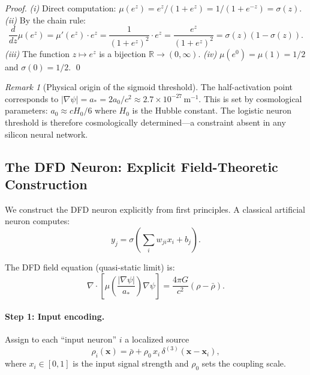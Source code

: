 \documentclass[11pt]{article}
\theoremstyle{definition}
\theoremstyle{remark}
\newtheorem{remark}[theorem]{Remark}
\newcommand{\astar}{a_*}
\newcommand{\mufn}{\mu}
\begin{document}
\begin{proof}
\textit{(i)} Direct computation: $\mufn(e^z) = e^z/(1+e^z) = 1/(1+e^{-z})
= \sigma(z)$. \textit{(ii)} By the chain rule:
\begin{equation}
\frac{d}{dz}\mufn(e^z) = \mufn'(e^z)\cdot e^z
= \frac{1}{(1+e^z)^2}\cdot e^z = \frac{e^z}{(1+e^z)^2}
= \sigma(z)(1-\sigma(z)).
\end{equation}
\textit{(iii)} The function $z \mapsto e^z$ is a bijection $\mathbb{R}\to(0,\infty)$.
\textit{(iv)} $\mufn(e^0) = \mufn(1) = 1/2$ and $\sigma(0) = 1/2$. \qed
\end{proof}

\begin{remark}[Physical origin of the sigmoid threshold]
The half-activation point corresponds to $|\nabla\psi| = \astar
= 2a_0/c^2 \approx 2.7\times10^{-27}\,\mathrm{m}^{-1}$. This is set by
cosmological parameters: $a_0 \approx cH_0/6$ where $H_0$ is the Hubble
constant. The logistic neuron threshold is therefore cosmologically
determined---a constraint absent in any silicon neural network.
\end{remark}

\subsection{The DFD Neuron: Explicit Field-Theoretic Construction}

We construct the DFD neuron explicitly from first principles. A classical
artificial neuron computes:
\begin{equation}
y_j = \sigma\!\left(\sum_i w_{ji} x_i + b_j\right).
\label{eq:classical_neuron}
\end{equation}

The DFD field equation (quasi-static limit) is:
\begin{equation}
\nabla\cdot\!\left[\mufn\!\left(\frac{|\nabla\psi|}{a_*}\right)\nabla\psi\right]
= \frac{4\pi G}{c^2}(\rho - \bar\rho).
\label{eq:dfd_field_eq}
\end{equation}

\paragraph{Step 1: Input encoding.}
Assign to each ``input neuron'' $i$ a localized source
\begin{equation}
\rho_i(\mathbf{x}) = \bar\rho + \rho_0\,x_i\,\delta^{(3)}(\mathbf{x}-\mathbf{x}_i),
\label{eq:input_source}
\end{equation}
where $x_i \in [0,1]$ is the input signal strength and $\rho_0$ sets the
coupling scale.
\end{document}
